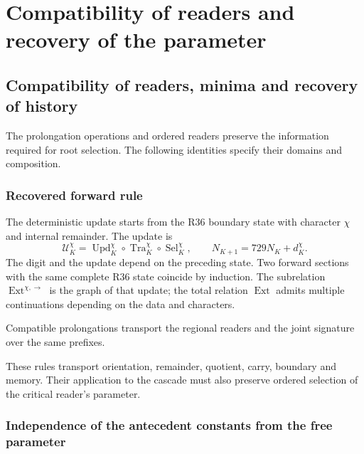 \section{Compatibility of readers and recovery of the parameter}
\label{hmtfg:fragmento:compatibilidad-de-lectores-y-restitucion-del-parametro}

\subsection{Compatibility of readers, minima and recovery of history}
\label{hmtfg:escalado:13}

The prolongation operations and ordered readers preserve the information required for root selection. The following identities specify their domains and composition.

\subsubsection{Recovered forward rule}
\label{hmtfg:escalado:13.1}

The deterministic update starts from the R36 boundary state with character \(\chi\) and internal remainder. The update is
\begin{equation}
\mathcal U_K^\chi=
\operatorname{Upd}_K^\chi\circ
\operatorname{Tra}_K^\chi\circ
\operatorname{Sel}_K^\chi,
\qquad
N_{K+1}=729N_K+d_K^\chi.
\label{hmtfg:escalado:eq:26}
\end{equation}
The digit and the update depend on the preceding state. Two forward sections with the same complete R36 state coincide by induction. The subrelation \(\operatorname{Ext}^{\chi,\rightarrow}\) is the graph of that update; the total relation \(\operatorname{Ext}\) admits multiple continuations depending on the data and characters.

Compatible prolongations transport the regional readers and the joint signature over the same prefixes.

These rules transport orientation, remainder, quotient, carry, boundary and memory. Their application to the cascade must also preserve ordered selection of the critical reader’s parameter.

\subsubsection{Independence of the antecedent constants from the free parameter}
\label{hmtfg:escalado:13.2}

